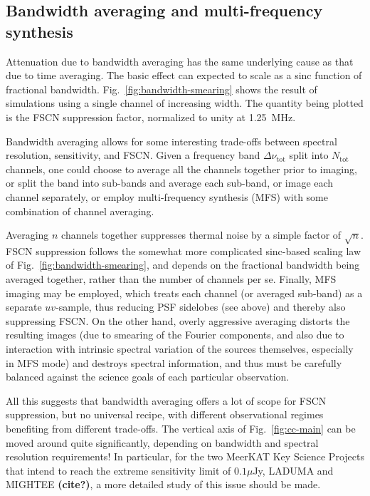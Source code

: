 \documentclass{aa}
\begin{document}
\subsection{Bandwidth averaging and multi-frequency synthesis}
\label{sec:freq-avg}

Attenuation due to bandwidth averaging has the same underlying cause as that due to time averaging. The basic effect can expected to scale as a sinc function of fractional bandwidth. Fig.~\ref{fig:bandwidth-smearing} shows the result of simulations using a single channel of increasing width. The quantity being plotted is the FSCN suppression factor, normalized to unity at 1.25~MHz.

Bandwidth averaging allows for some interesting trade-offs between spectral resolution, sensitivity, and FSCN. Given a frequency band $\Delta\nu_\mathrm{tot}$ split into $N_\mathrm{tot}$ channels, one could choose to average all the channels together prior to imaging, or split the band into sub-bands and average each sub-band, or image each channel separately, or employ multi-frequency synthesis (MFS) with some combination of channel averaging. 

Averaging $n$ channels together suppresses thermal noise by a simple factor of $\sqrt{n}$. FSCN suppression follows the somewhat more complicated sinc-based scaling law of Fig.~\ref{fig:bandwidth-smearing}, and depends on the fractional bandwidth being averaged together, rather than the number of channels per se. Finally, MFS imaging may be employed, which treats each channel (or averaged sub-band) as a separate $uv$-sample, thus reducing PSF sidelobes (see above) and thereby also suppressing FSCN. On the other hand, overly aggressive averaging distorts the resulting images (due to smearing of the Fourier components, and also due to interaction with intrinsic spectral variation of the sources themselves, especially in MFS mode) and destroys spectral information, and thus must be carefully balanced against the science goals of each particular observation.

All this suggests that bandwidth averaging offers a lot of scope for FSCN suppression, but no universal recipe, with different observational regimes benefiting from different trade-offs. The vertical axis of Fig.~\ref{fig:cc-main} can be moved around quite significantly, depending on bandwidth and spectral resolution requirements! In particular, for the two MeerKAT Key Science Projects that intend to reach the extreme sensitivity limit of $0.1\mu$Jy, LADUMA and MIGHTEE {\bf (cite?)}, a more detailed study of this issue should be made.
\end{document}
